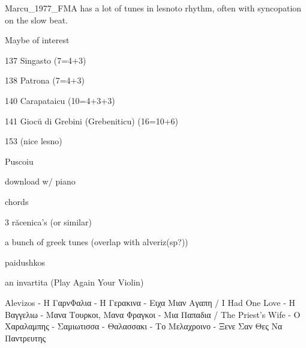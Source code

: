 
Marcu_1977_FMA has a lot of tunes in lesnoto rhythm, often with syncopation on the slow beat.

Maybe of interest
\item{137} Singasto (7=4+3)
\item{138} Patrona (7=4+3)
\item{140} Carapataicu (10=4+3+3)
\item{141} Giocŭ di Grebini (Grebeniticu) (16=10+6)
\item{153} (nice lesno)


Puscoiu
\item download w/ piano
\item chords
\item 3 răcenica's (or similar)
\item a bunch of greek tunes (overlap with alveriz(sp?))
\item paidushkos
\item an invartita (Play Again Your Violin)

Alevizos
 - Η ΓαρνΦαλια
 - Η Γερακινα
 - Ειχα Μιαν Αγαπη / I Had One Love
 - Η Βαγγελιω
 - Μανα Τουρκοι, Μανα Φραγκοι
 - Μια Παπαδια / The Priest's Wife
 - Ο Χαραλαμπης
 - Σαμιωτισσα
 - Θαλασσακι
 - Το Μελαχροινο
 - Ξενε Σαν Θες Να Παντρευτης
